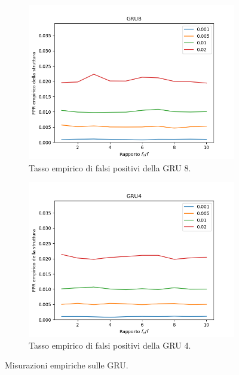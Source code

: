 \documentclass[../../main.tex]{subfiles}
\begin{document}
\begin{figure}[H]
        \begin{subfigure}[b]{0.32\textwidth}
            \centering
            \includegraphics[width = \textwidth]{immagini/7/SLBF/GRU8_FPR.png}
            \caption{Tasso empirico di falsi positivi della GRU 8.}
            \label{fig:SLBFFPR_GRU8}
        \end{subfigure}
        \begin{subfigure}[b]{0.32\textwidth}
            \centering
            \includegraphics[width = \textwidth]{immagini/7/SLBF/GRU4_FPR.png}
            \caption{Tasso empirico di falsi positivi della GRU 4.}
            \label{fig:SLBFFPR_GRU4}
        \end{subfigure}
        \caption{Misurazioni empiriche sulle GRU.}
        \label{fig:GRUEmpiricoSLBF}
    \end{figure}
\end{document}
